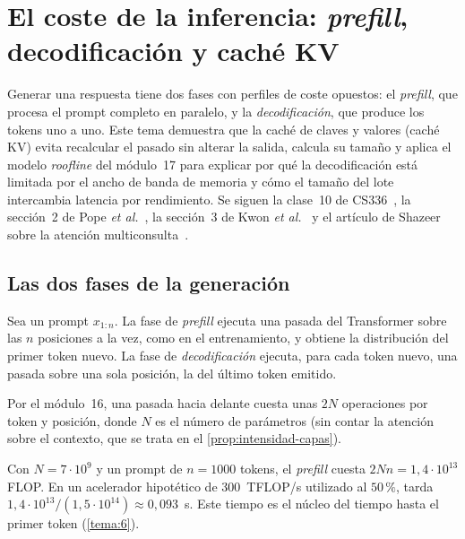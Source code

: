 \chapter{El coste de la inferencia: \emph{prefill}, decodificación y caché KV}
\label{tema:2}

Generar una respuesta tiene dos fases con perfiles de coste opuestos: el \emph{prefill}, que procesa el prompt completo en paralelo, y la \emph{decodificación}, que produce los tokens uno a uno. Este tema demuestra que la caché de claves y valores (caché KV) evita recalcular el pasado sin alterar la salida, calcula su tamaño y aplica el modelo \emph{roofline} del módulo~17 para explicar por qué la decodificación está limitada por el ancho de banda de memoria y cómo el tamaño del lote intercambia latencia por rendimiento. Se siguen la clase~10 de CS336~\cite{cs336}, la sección~2 de Pope \emph{et al.}~\cite{pope}, la sección~3 de Kwon \emph{et al.}~\cite{kwon} y el artículo de Shazeer sobre la atención multiconsulta~\cite{shazeer}.

\section{Las dos fases de la generación}

\begin{definicion}\label{def:fases}
Sea un prompt $x_{1:n}$. La fase de \emph{prefill} ejecuta una pasada del Transformer sobre las $n$ posiciones a la vez, como en el entrenamiento, y obtiene la distribución del primer token nuevo. La fase de \emph{decodificación} ejecuta, para cada token nuevo, una pasada sobre una sola posición, la del último token emitido.
\end{definicion}

Por el módulo~16, una pasada hacia delante cuesta unas $2N$ operaciones por token y posición, donde $N$ es el número de parámetros (sin contar la atención sobre el contexto, que se trata en el \cref{prop:intensidad-capas}).

\begin{ejemplo}\label{ej:prefill}
Con $N=7\cdot 10^{9}$ y un prompt de $n=1000$ tokens, el \emph{prefill} cuesta $2Nn=1{,}4\cdot 10^{13}$ FLOP. En un acelerador hipotético de $300$~TFLOP/s utilizado al $50\,\%$, tarda $1{,}4\cdot 10^{13}/(1{,}5\cdot 10^{14})\approx 0{,}093$~s. Este tiempo es el núcleo del tiempo hasta el primer token (\cref{tema:6}).
\end{ejemplo}

